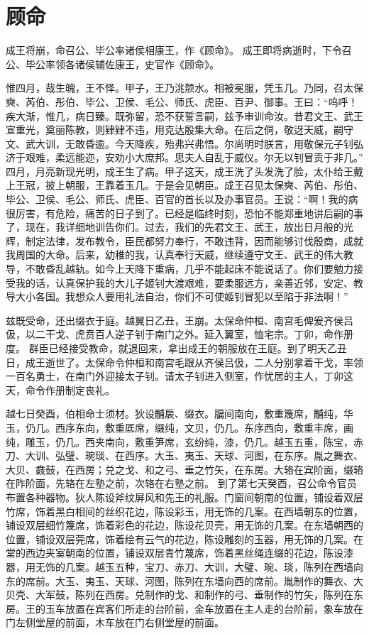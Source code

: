 \documentclass[a4paper,12pt,UTF8,twoside]{ctexbook}
\begin{document}
\chapter{顾命}

成王将崩，命召公、毕公率诸侯相康王，作《顾命》。
成王即将病逝时，下令召公、毕公率领各诸侯辅佐康王，史官作《顾命》。

惟四月，哉生魄，王不怿。甲子，王乃洮颒水。相被冕服，凭玉几。乃同，召太保奭、芮伯、彤伯、毕公、卫侯、毛公、师氏、虎臣、百尹、御事。王曰：“呜呼！疾大渐，惟几，病日臻。既弥留，恐不获誓言嗣，兹予审训命汝。昔君文王、武王宣重光，奠丽陈教，则肄肄不违，用克达殷集大命。在后之侗，敬迓天威，嗣守文、武大训，无敢昏逾。今天降疾，殆弗兴弗悟。尔尚明时朕言，用敬保元子钊弘济于艰难，柔远能迩，安劝小大庶邦。思夫人自乱于威仪。尔无以钊冒贡于非几。”
四月，月亮新现光明，成王生了病。甲子这天，成王洗了头发洗了脸，太仆给王戴上王冠，披上朝服，王靠着玉几。于是会见朝臣。成王召见太保奭、芮伯、彤伯、毕公、卫侯、毛公、师氏、虎臣、百官的首长以及办事官员。王说：“啊！我的病很厉害，有危险，痛苦的日子到了。已经是临终时刻，恐怕不能郑重地讲后嗣的事了，现在，我详细地训告你们。过去，我们的先君文王、武王，放出日月般的光辉，制定法律，发布教令，臣民都努力奉行，不敢违背，因而能够讨伐殷商，成就我周国的大命。后来，幼稚的我，认真奉行天威，继续遵守文王、武王的伟大教导，不敢昏乱越轨。如今上天降下重病，几乎不能起床不能说话了。你们要勉力接受我的话，认真保护我的大儿子姬钊大渡艰难，要柔服远方，亲善近邻，安定、教导大小各国。我想众人要用礼法自治，你们不可使姬钊冒犯以至陷于非法啊！”

兹既受命，还出缀衣于庭。越翼日乙丑，王崩。太保命仲桓、南宫毛俾爰齐侯吕伋，以二干戈、虎贲百人逆子钊于南门之外。延入翼室，恤宅宗。丁卯，命作册度。
群臣已经接受教命，就退回来，拿出成王的朝服放在王庭。到了明天乙丑日，成王逝世了。太保命令仲桓和南宫毛跟从齐侯吕伋，二人分别拿着干戈，率领一百名勇士，在南门外迎接太子钊。请太子钊进入侧室，作忧居的主人，丁卯这天，命令作册制定丧礼。

越七日癸酉，伯相命士须材。狄设黼扆、缀衣。牖间南向，敷重篾席，黼纯，华玉，仍几。西序东向，敷重厎席，缀纯，文贝，仍几。东序西向，敷重丰席，画纯，雕玉，仍几。西夹南向，敷重笋席，玄纷纯，漆，仍几。越玉五重，陈宝，赤刀、大训、弘璧、琬琰、在西序。大玉、夷玉、天球、河图，在东序。胤之舞衣、大贝、鼖鼓，在西房；兑之戈、和之弓、垂之竹矢，在东房。大辂在宾阶面，缀辂在阼阶面，先辂在左塾之前，次辂在右塾之前。
到了第七天癸酉，召公命令官员布置各种器物。狄人陈设斧纹屏风和先王的礼服。门窗间朝南的位置，铺设着双层竹席，饰着黑白相间的丝织花边，陈设彩玉，用无饰的几案。在西墙朝东的位置，铺设双层细竹篾席，饰着彩色的花边，陈设花贝壳，用无饰的几案。在东墙朝西的位置，铺设双层莞席，饰着绘有云气的花边，陈设雕刻的玉器，用无饰的几案。在堂的西边夹室朝南的位置，铺设双层青竹蔑席，饰着黑丝绳连缀的花边，陈设漆器，用无饰的几案。越玉五种，宝刀、赤刀、大训，大璧、琬、琰，陈列在西墙向东的席前。大玉、夷玉、天球、河图，陈列在东墙向西的席前。胤制作的舞衣、大贝壳、大军鼓，陈列在西房。兑制作的戈、和制作的弓、垂制作的竹矢，陈列在东房。王的玉车放置在宾客们所走的台阶前，金车放置在主人走的台阶前，象车放在门左侧堂屋的前面，木车放在门右侧堂屋的前面。
\end{document}

